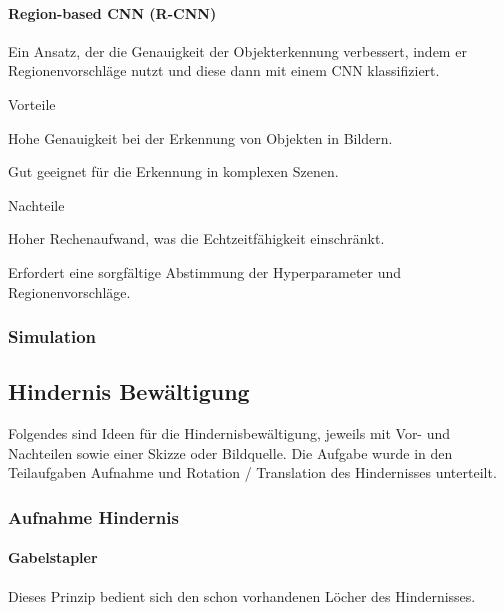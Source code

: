 \paragraph{Region-based CNN (R-CNN)}

Ein Ansatz, der die Genauigkeit der Objekterkennung verbessert, indem er Regionenvorschläge nutzt und diese dann mit einem CNN klassifiziert.

\begin{minipage}[t]{0.48\textwidth}
    \begin{items}
      \item [Vorteile]
      \item Hohe Genauigkeit bei der Erkennung von Objekten in Bildern.
      \item Gut geeignet für die Erkennung in komplexen Szenen.
    \end{items}
\end{minipage}
\hfill
\begin{minipage}[t]{0.48\textwidth}
    \begin{items}
      \item [Nachteile]
      \item Hoher Rechenaufwand, was die Echtzeitfähigkeit einschränkt.
      \item Erfordert eine sorgfältige Abstimmung der Hyperparameter und Regionenvorschläge.
    \end{items}
\end{minipage}



\subsubsection{Simulation}


\newpage
\subsection{Hindernis Bewältigung}
Folgendes sind Ideen für die Hindernisbewältigung, jeweils mit Vor- und Nachteilen sowie einer Skizze oder Bildquelle. Die Aufgabe wurde in den Teilaufgaben Aufnahme und Rotation / Translation des Hindernisses unterteilt. 

\subsubsection{Aufnahme Hindernis}
\paragraph{Gabelstapler}
Dieses Prinzip bedient sich den schon vorhandenen Löcher des Hindernisses.

